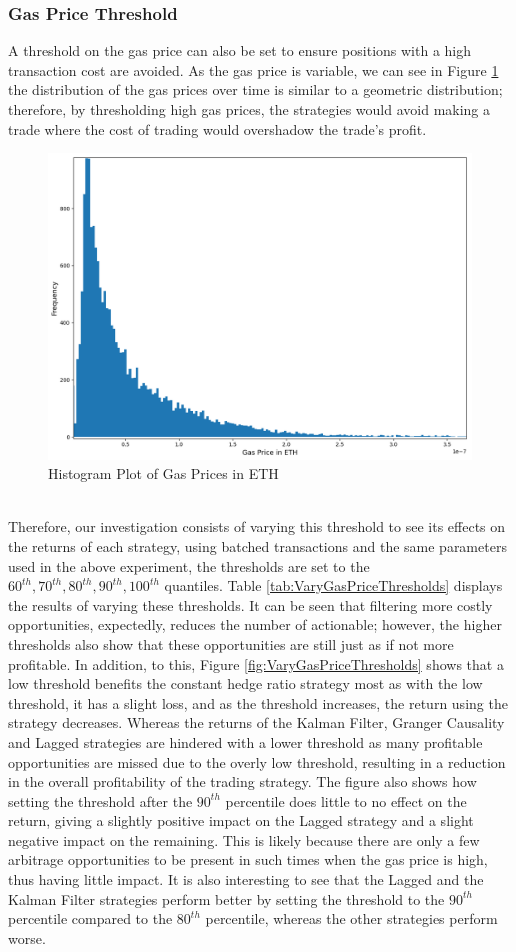 \subsubsection{Gas Price Threshold}
A threshold on the gas price can also be set to ensure positions with a high transaction cost are avoided. As the gas price is variable, we can see in Figure \ref{fig:GasPriceHistogram} the distribution of the gas prices over time is similar to a geometric distribution; therefore, by thresholding high gas prices, the strategies would avoid making a trade where the cost of trading would overshadow the trade's profit.
\begin{figure}[h!]
    \centering
    \includegraphics[width=0.7\linewidth]{evaluation/Images/GasPriceHistogram.png}
    \caption{Histogram Plot of Gas Prices in ETH}
    \label{fig:GasPriceHistogram}
\end{figure}
\\[3mm]
\noindent Therefore, our investigation consists of varying this threshold to see its effects on the returns of each strategy, using batched transactions and the same parameters used in the above experiment, the thresholds are set to the $60^{th}, 70^{th},80^{th},90^{th},100^{th}$ quantiles. Table \ref{tab:VaryGasPriceThresholds} displays the results of varying these thresholds. It can be seen that filtering more costly opportunities, expectedly, reduces the number of actionable; however, the higher thresholds also show that these opportunities are still just as if not more profitable. In addition, to this, Figure \ref{fig:VaryGasPriceThresholds} shows that a low threshold benefits the constant hedge ratio strategy most as with the low threshold, it has a slight loss, and as the threshold increases, the return using the strategy decreases. Whereas the returns of the Kalman Filter, Granger Causality and Lagged strategies are hindered with a lower threshold as many profitable opportunities are missed due to the overly low threshold, resulting in a reduction in the overall profitability of the trading strategy. The figure also shows how setting the threshold after the $90^{th}$ percentile does little to no effect on the return, giving a slightly positive impact on the Lagged strategy and a slight negative impact on the remaining. This is likely because there are only a few arbitrage opportunities to be present in such times when the gas price is high, thus having little impact. It is also interesting to see that the Lagged and the Kalman Filter strategies perform better by setting the threshold to the $90^{th}$ percentile compared to the $80^{th}$ percentile, whereas the other strategies perform worse.
